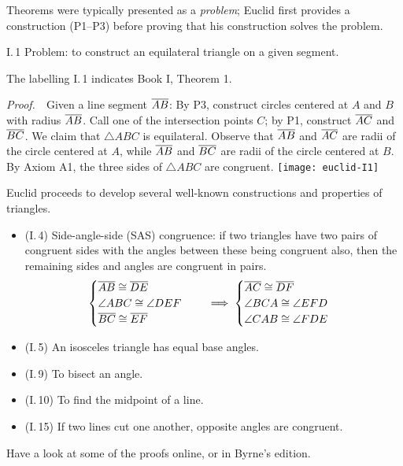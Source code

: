 
Theorems were typically presented as a \emph{problem}; Euclid first provides a construction (P1--P3) before proving that his construction solves the problem.

\begin{thm}{I.\,1}{}
Problem: to construct an equilateral triangle on a given segment.
\end{thm}

The labelling I.\,1 indicates Book I, Theorem 1.

\begin{tcolorbox}[proofstyle, lower separated=false, sidebyside, sidebyside align=top seam, sidebyside gap=0pt, righthand width=0.35\linewidth]
\emph{Proof.}\ \ Given a line segment $\overline{AB}$:\smallbreak
By P3, construct circles centered at $A$ and $B$ with radius $\overline{AB}$.\smallbreak
Call one of the intersection points $C$; by P1, construct $\overline{AC}$ and $\overline{BC}$.\smallbreak
We claim that $\triangle ABC$ is equilateral.\medbreak
Observe that $\overline{AB}$ and $\overline{AC}$ are radii of the circle centered at $A$, while $\overline{AB}$ and $\overline{BC}$ are radii of the circle centered at $B$. By Axiom A1, the three sides of $\triangle ABC$ are congruent.
\tcblower\flushright\texttt{[image: euclid-I1]}\hfil\qedsymbol
\end{tcolorbox}


Euclid proceeds to develop several well-known constructions and properties of triangles.
\begin{itemize}\itemsep0pt
  \item (I.\,4) Side-angle-side (SAS) congruence: if two triangles have two pairs of congruent sides with the angles between these being congruent also, then the remaining sides and angles are congruent in pairs.
  \[\begin{cases}
  \overline{AB}\cong\overline{DE}\\
  \angle ABC\cong\angle DEF\\
  \overline{BC}\cong\overline{EF}
  \end{cases}
  \quad\implies
  \begin{cases}
  \overline{AC}\cong\overline{DF}\\
  \angle BCA\cong\angle EFD\\
  \angle CAB\cong\angle FDE
  \end{cases}\]
  \item (I.\,5) An isosceles triangle has equal base angles.
  \item (I.\,9) To bisect an angle.
  \item (I.\,10) To find the midpoint of a line.
  \item (I.\,15) If two lines cut one another, opposite angles are congruent.
\end{itemize}
Have a look at some of the proofs online, or in Byrne's edition.

